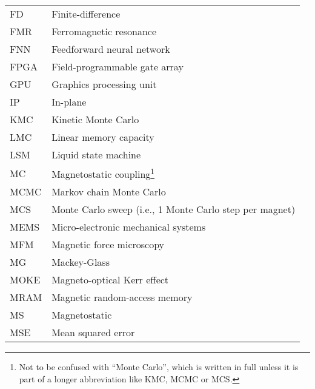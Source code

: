 {\begin{longtable}[l]{ll}
        FD    & Finite-difference                           \\
        FMR   & Ferromagnetic resonance                     \\
        FNN   & Feedforward neural network                  \\
        FPGA  & Field-programmable gate array               \\
        GPU   & Graphics processing unit                    \\
        IP    & In-plane                                    \\
        KMC   & Kinetic Monte Carlo                         \\
        LMC   & Linear memory capacity                      \\
        LSM   & Liquid state machine                        \\
        MC    & Magnetostatic coupling\footnote{Not to be confused with ``Monte Carlo'', which is written in full unless it is part of a longer abbreviation like KMC, MCMC or MCS.} \\
        MCMC  & Markov chain Monte Carlo                    \\
        MCS   & Monte Carlo sweep (i.e., 1 Monte Carlo step per magnet) \\
        MEMS  & Micro-electronic mechanical systems         \\
        MFM   & Magnetic force microscopy                   \\
        MG    & Mackey-Glass                                \\
        MOKE  & Magneto-optical Kerr effect                 \\
        MRAM  & Magnetic random-access memory               \\
        MS    & Magnetostatic                               \\
        MSE   & Mean squared error                          \\

\end{longtable}}
